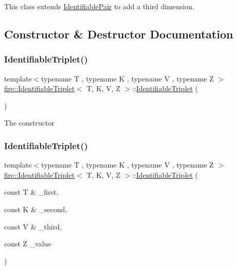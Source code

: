 This class extends \hyperlink{a00772}{Identifiable\+Pair} to add a third dimension. 

\subsection{Constructor \& Destructor Documentation}
\mbox{\label{a00776_aadcc9b484d16fc1f286e969bad059976}} 
\subsubsection{\texorpdfstring{Identifiable\+Triplet()}{IdentifiableTriplet()}\hspace{0.1cm}{\footnotesize\ttfamily [1/2]}}
{\footnotesize\ttfamily template$<$typename T , typename K , typename V , typename Z $>$ \\
\hyperlink{a00776}{fire\+::\+Identifiable\+Triplet}$<$ T, K, V, Z $>$\+::\hyperlink{a00776}{Identifiable\+Triplet} (\begin{DoxyParamCaption}{ }\end{DoxyParamCaption})\hspace{0.3cm}{\ttfamily [inline]}}

The constructor \mbox{\label{a00776_a4c43fb95e33d2b67ffb934991a986b68}} 
\subsubsection{\texorpdfstring{Identifiable\+Triplet()}{IdentifiableTriplet()}\hspace{0.1cm}{\footnotesize\ttfamily [2/2]}}
{\footnotesize\ttfamily template$<$typename T , typename K , typename V , typename Z $>$ \\
\hyperlink{a00776}{fire\+::\+Identifiable\+Triplet}$<$ T, K, V, Z $>$\+::\hyperlink{a00776}{Identifiable\+Triplet} (\begin{DoxyParamCaption}\item[{const T \&}]{\+\_\+first,  }\item[{const K \&}]{\+\_\+second,  }\item[{const V \&}]{\+\_\+third,  }\item[{const Z}]{\+\_\+value }\end{DoxyParamCaption})\hspace{0.3cm}{\ttfamily [inline]}}

